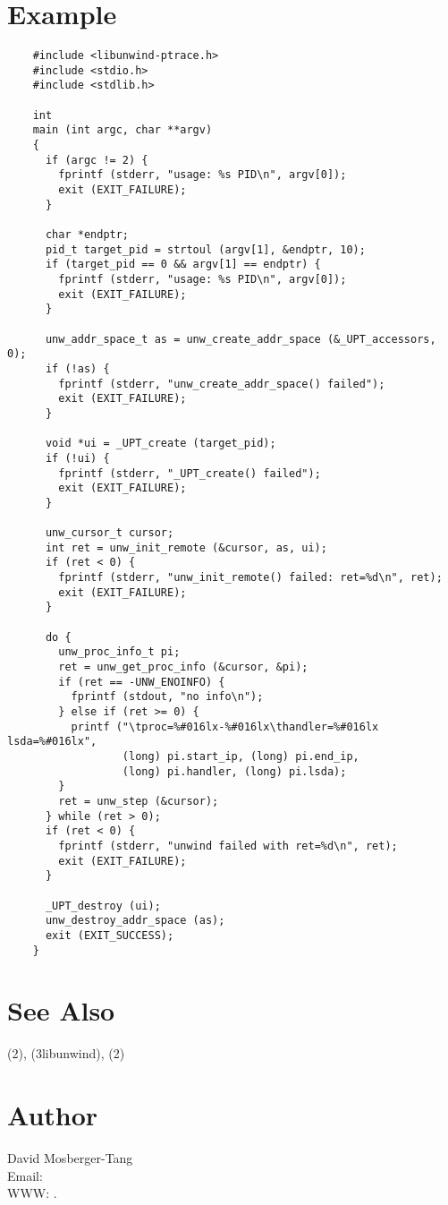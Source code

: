 \documentclass{article}
\begin{document}
\section{Example}
\begin{verbatim}
    #include <libunwind-ptrace.h>
    #include <stdio.h>
    #include <stdlib.h>

    int
    main (int argc, char **argv)
    {
      if (argc != 2) {
        fprintf (stderr, "usage: %s PID\n", argv[0]);
        exit (EXIT_FAILURE);
      }

      char *endptr;
      pid_t target_pid = strtoul (argv[1], &endptr, 10);
      if (target_pid == 0 && argv[1] == endptr) {
        fprintf (stderr, "usage: %s PID\n", argv[0]);
        exit (EXIT_FAILURE);
      }

      unw_addr_space_t as = unw_create_addr_space (&_UPT_accessors, 0);
      if (!as) {
        fprintf (stderr, "unw_create_addr_space() failed");
        exit (EXIT_FAILURE);
      }

      void *ui = _UPT_create (target_pid);
      if (!ui) {
        fprintf (stderr, "_UPT_create() failed");
        exit (EXIT_FAILURE);
      }

      unw_cursor_t cursor;
      int ret = unw_init_remote (&cursor, as, ui);
      if (ret < 0) {
        fprintf (stderr, "unw_init_remote() failed: ret=%d\n", ret);
        exit (EXIT_FAILURE);
      }

      do {
        unw_proc_info_t pi;
        ret = unw_get_proc_info (&cursor, &pi);
        if (ret == -UNW_ENOINFO) {
          fprintf (stdout, "no info\n");
        } else if (ret >= 0) {
          printf ("\tproc=%#016lx-%#016lx\thandler=%#016lx lsda=%#016lx",
                  (long) pi.start_ip, (long) pi.end_ip,
                  (long) pi.handler, (long) pi.lsda);
        }
        ret = unw_step (&cursor);
      } while (ret > 0);
      if (ret < 0) {
        fprintf (stderr, "unwind failed with ret=%d\n", ret);
        exit (EXIT_FAILURE);
      }

      _UPT_destroy (ui);
      unw_destroy_addr_space (as);
      exit (EXIT_SUCCESS);
    }
\end{verbatim}

\section{See Also}

(2),
(3libunwind),
(2)

\section{Author}

\noindent
David Mosberger-Tang\\
Email: \\
WWW: .
\LatexManEnd
\end{document}
